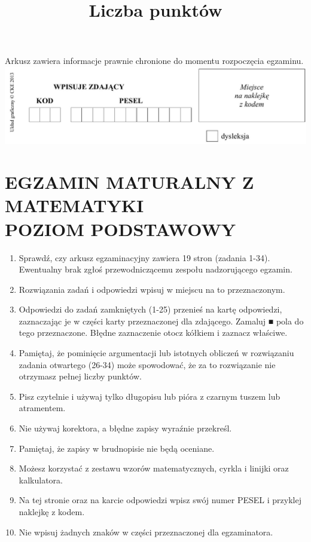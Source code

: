 \documentclass[10pt]{article}
\title{Liczba punktów }
\author{}
\date{}
\begin{document}
\maketitle
Arkusz zawiera informacje prawnie chronione do momentu rozpoczęcia egzaminu.\\
\includegraphics[max width=\textwidth, center]{2024_11_21_0c267759828927e3a26dg-01}

\section*{EGZAMIN MATURALNY Z MATEMATYKI \\
 POZIOM PODSTAWOWY}
\begin{enumerate}
  \item Sprawdź, czy arkusz egzaminacyjny zawiera 19 stron (zadania 1-34). Ewentualny brak zgłoś przewodniczącemu zespołu nadzorującego egzamin.
  \item Rozwiązania zadań i odpowiedzi wpisuj w miejscu na to przeznaczonym.
  \item Odpowiedzi do zadań zamkniętych (1-25) przenieś na kartę odpowiedzi, zaznaczając je w części karty przeznaczonej dla zdającego. Zamaluj ■ pola do tego przeznaczone. Błędne zaznaczenie otocz kółkiem i zaznacz właściwe.
  \item Pamiętaj, że pominięcie argumentacji lub istotnych obliczeń w rozwiązaniu zadania otwartego (26-34) może spowodować, że za to rozwiązanie nie otrzymasz pełnej liczby punktów.
  \item Pisz czytelnie i używaj tylko długopisu lub pióra z czarnym tuszem lub atramentem.
  \item Nie używaj korektora, a błędne zapisy wyraźnie przekreśl.
  \item Pamiętaj, że zapisy w brudnopisie nie będą oceniane.
  \item Możesz korzystać z zestawu wzorów matematycznych, cyrkla i linijki oraz kalkulatora.
  \item Na tej stronie oraz na karcie odpowiedzi wpisz swój numer PESEL i przyklej naklejkę z kodem.
  \item Nie wpisuj żadnych znaków w części przeznaczonej dla egzaminatora.
\end{enumerate}
\end{document}

